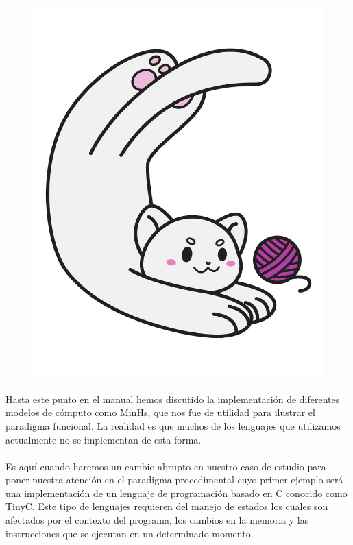 
\begin{figure}[htbp]
    \centerline{\includegraphics[scale=.35]{assets/09_Gatito_C.png}}
\end{figure}

Hasta este punto en el manual hemos discutido la implementación de diferentes modelos de cómputo como \textsf{MinHs}, que nos fue de utilidad para ilustrar el paradigma funcional. La realidad es que muchos de los lenguajes que utilizamos actualmente no se implementan de esta forma.\\\\
Es aquí cuando haremos un cambio abrupto en nuestro caso de estudio para poner nuestra atención en el paradigma procedimental cuyo primer ejemplo será una implementación de un lenguaje de programación basado en \textsf{C} conocido como \textsf{TinyC}. Este tipo de lenguajes requieren del manejo de estados los cuales son afectados por el contexto del programa, los cambios en la memoria y las instrucciones que se ejecutan en un determinado momento.


